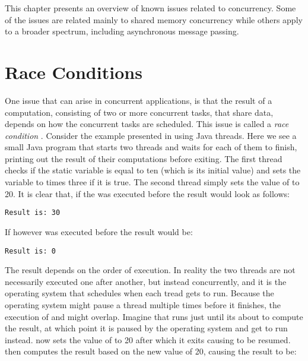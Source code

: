 \makeatletter {}\makeatother
{}
This chapter presents an overview of known issues related to concurrency. Some of the issues are related mainly to shared memory concurrency while others apply to a broader spectrum, including asynchronous message passing.

\section{Race Conditions}
One issue that can arise in concurrent applications, is that the result of a computation, consisting of two or more concurrent tasks, that share data, depends on how the concurrent tasks are scheduled. This issue is called a \emph{race condition}
\cite[p. 983]{bryant2011computer}\cite[p. 115]{tanenbaum2008modern}. Consider the example presented in  using Java threads. Here we see a small Java program that starts two threads and waits for each of them to finish, printing out the result of their computations before exiting. The first thread checks if the static variable  is equal to ten (which is its initial value) and sets the  variable to  times three if it is true. The second thread simply sets the value of  to 20. It is clear that, if the  was executed before  the result would look as follows:
\begin{verbatim}
Result is: 30
\end{verbatim}
If however  was executed before  the result would be:
\begin{verbatim}
Result is: 0
\end{verbatim}
The result depends on the order of execution. In reality the two threads are not necessarily executed one after another, but instead concurrently, and it is the operating system that schedules when each tread gets to run. Because the operating system might pause a thread multiple times before it finishes, the execution of  and  might overlap. Imagine that  runs just until its about to compute the result, at which point it is paused by the operating system and  get to run instead.  now sets the value of  to 20 after which it exits causing  to be resumed.  then computes the result based on the new  value of 20, causing the result to be:
